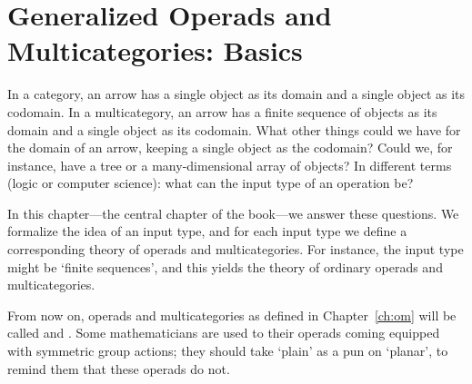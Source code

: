 
\chapter{Generalized Operads and Multicategories: Basics}




\noindent
In a category, an arrow has a single object as its domain and a single
object as its codomain.  In a multicategory, an arrow has a finite sequence
of objects as its domain and a single object as its codomain.  What other
things could we have for the domain of an arrow, keeping a single object as
the codomain?  Could we, for instance, have a tree or a many-dimensional
array of objects?  In different terms (logic or computer science): what can
the input%
%
%
type of an operation be?

In this chapter---the central chapter of the book---we answer these
questions.  We formalize the idea of an input type, and for each input type
we define a corresponding theory of operads and multicategories.  For
instance, the input type might be `finite sequences', and this yields the
theory of ordinary operads and multicategories.  

From now on, operads and multicategories as defined in Chapter~\ref{ch:om}
will be called %
%
%
%
%
and .%
%
%
Some mathematicians are used to their operads coming equipped with
symmetric group actions; they should take `plain' as a pun on `planar', to
remind them that these operads do not.

